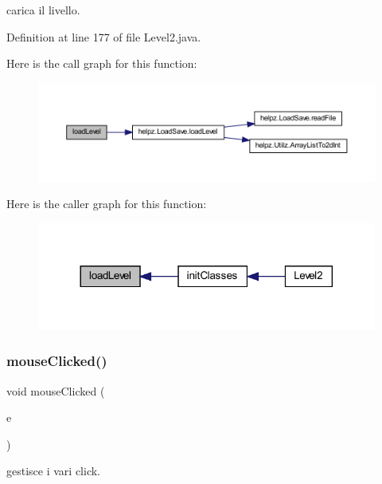 carica il livello. 



Definition at line 177 of file Level2.\+java.

Here is the call graph for this function\+:
\nopagebreak
\begin{figure}[H]
\begin{center}
\leavevmode
\includegraphics[width=350pt]{classscenes_1_1_level2_a286931cc46e197f4a85af7229fdc29a4_cgraph}
\end{center}
\end{figure}
Here is the caller graph for this function\+:\nopagebreak
\begin{figure}[H]
\begin{center}
\leavevmode
\includegraphics[width=317pt]{classscenes_1_1_level2_a286931cc46e197f4a85af7229fdc29a4_icgraph}
\end{center}
\end{figure}
\mbox{\label{classscenes_1_1_level2_a45d56bd84238e8b56589dfc732e2b2cf}} 
\subsubsection{\texorpdfstring{mouse\+Clicked()}{mouseClicked()}}
{\footnotesize\ttfamily void mouse\+Clicked (\begin{DoxyParamCaption}\item[{Mouse\+Event}]{e }\end{DoxyParamCaption})}



gestisce i vari click. 


